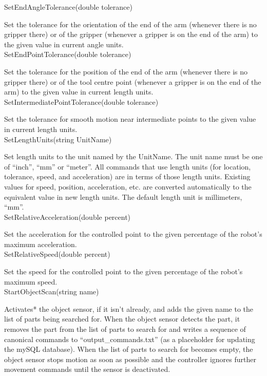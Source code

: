 \sf SetEndAngleTolerance(double tolerance)\rm

Set the tolerance for the orientation of the end of the arm (whenever there
is no gripper there) or of the gripper (whenever a gripper is on the end of
the arm) to the given value in current angle units.\\

\sf SetEndPointTolerance(double tolerance)\rm

Set the tolerance for the position of the end of the arm (whenever there
is no gripper there) or of the tool centre point (whenever a gripper is on
the end of the arm) to the given value in current length units.\\

\sf SetIntermediatePointTolerance(double tolerance)\rm

Set the tolerance for smooth motion near intermediate points to the given
value in current length units.\\

\sf SetLengthUnits(string UnitName)\rm

Set length units to the unit named by the UnitName.
The unit name must be one of ``inch'', ``mm'' or ``meter''. All commands that
use length units (for location, tolerance, speed, and acceleration) are
in terms of those length units. Existing values for speed, position,
acceleration, etc. are converted automatically to the equivalent value
in new length units. The default length unit is millimeters, ``mm''.\\

\sf SetRelativeAcceleration(double percent)\rm

Set the acceleration for the controlled point to the given percentage of
the robot's maximum acceleration.\\

\sf SetRelativeSpeed(double percent)\rm


Set the speed for the controlled point to the given percentage of the
robot's maximum speed.\\

\sf StartObjectScan(string name)\rm

Activates* the object sensor, if it isn't already, and adds the given 
name to the list of parts being searched for. When the object sensor
detects the part, it removes the part from the list of parts to search
for and writes a sequence of canonical commands to ``output\_commands.txt'' 
(as a placeholder for updating the mySQL database). When the list of parts
to search for becomes empty, the object sensor stops motion as soon as 
possible and the controller ignores further movement commands until the
sensor is deactivated.\\

